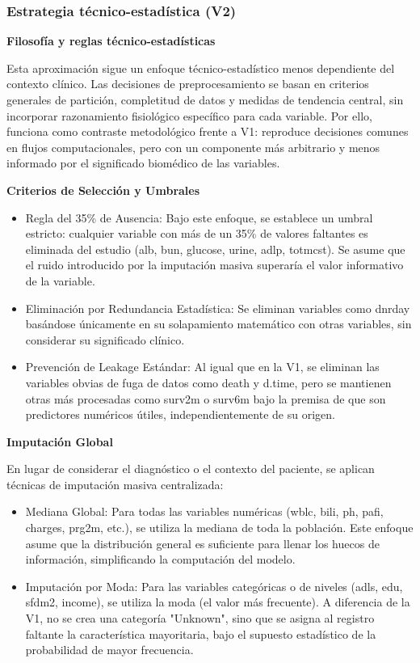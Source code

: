 \subsubsection{Estrategia técnico-estadística (V2)}

\textbf{Filosofía y reglas técnico-estadísticas}

Esta aproximación sigue un enfoque técnico-estadístico menos dependiente del
contexto clínico. Las decisiones de preprocesamiento se basan en criterios
generales de partición, completitud de datos y medidas de tendencia central,
sin incorporar razonamiento fisiológico específico para cada variable. Por ello,
funciona como contraste metodológico frente a V1: reproduce decisiones comunes
en flujos computacionales, pero con un componente más arbitrario y menos
informado por el significado biomédico de las variables.

\textbf{Criterios de Selección y Umbrales}

\begin{itemize}
  \item Regla del 35\% de Ausencia: Bajo este enfoque, se establece un umbral
    estricto: cualquier variable con más de un 35\% de valores faltantes es
    eliminada del estudio (alb, bun, glucose, urine, adlp,
    totmcst). Se asume que el ruido introducido por la imputación masiva
    superaría el valor informativo de la variable.
  \item Eliminación por Redundancia Estadística: Se eliminan variables como dnrday
    basándose únicamente en su solapamiento matemático con otras variables, sin
    considerar su significado clínico.
  \item Prevención de Leakage Estándar: Al igual que en la V1, se eliminan las
    variables obvias de fuga de datos como death y d.time, pero se mantienen
    otras más procesadas como surv2m o surv6m bajo la premisa de que son
    predictores numéricos útiles, independientemente de su origen.
\end{itemize}

\textbf{Imputación Global}

En lugar de considerar el diagnóstico o el contexto del paciente, se aplican
técnicas de imputación masiva centralizada:

\begin{itemize}
  \item Mediana Global: Para todas las variables numéricas (wblc, bili, ph, pafi,
    charges, prg2m, etc.), se utiliza la mediana de toda la población. Este
    enfoque asume que la distribución general es suficiente para llenar los
    huecos de información, simplificando la computación del modelo.
  \item Imputación por Moda: Para las variables categóricas o de niveles (adls, edu,
    sfdm2, income), se utiliza la moda (el valor más frecuente). A diferencia de
    la V1, no se crea una categoría "Unknown", sino que se asigna al registro
    faltante la característica mayoritaria, bajo el supuesto estadístico de la
    probabilidad de mayor frecuencia.
\end{itemize}

